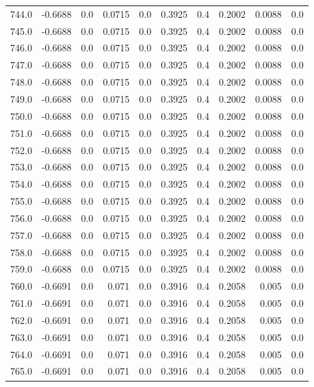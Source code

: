 \begin{longtable}{lrrrrrrrrr}
744.0 & -0.6688 & 0.0 & 0.0715 & 0.0 & 0.3925 & 0.4 & 0.2002 & 0.0088 & 0.0 \\
745.0 & -0.6688 & 0.0 & 0.0715 & 0.0 & 0.3925 & 0.4 & 0.2002 & 0.0088 & 0.0 \\
746.0 & -0.6688 & 0.0 & 0.0715 & 0.0 & 0.3925 & 0.4 & 0.2002 & 0.0088 & 0.0 \\
747.0 & -0.6688 & 0.0 & 0.0715 & 0.0 & 0.3925 & 0.4 & 0.2002 & 0.0088 & 0.0 \\
748.0 & -0.6688 & 0.0 & 0.0715 & 0.0 & 0.3925 & 0.4 & 0.2002 & 0.0088 & 0.0 \\
749.0 & -0.6688 & 0.0 & 0.0715 & 0.0 & 0.3925 & 0.4 & 0.2002 & 0.0088 & 0.0 \\
750.0 & -0.6688 & 0.0 & 0.0715 & 0.0 & 0.3925 & 0.4 & 0.2002 & 0.0088 & 0.0 \\
751.0 & -0.6688 & 0.0 & 0.0715 & 0.0 & 0.3925 & 0.4 & 0.2002 & 0.0088 & 0.0 \\
752.0 & -0.6688 & 0.0 & 0.0715 & 0.0 & 0.3925 & 0.4 & 0.2002 & 0.0088 & 0.0 \\
753.0 & -0.6688 & 0.0 & 0.0715 & 0.0 & 0.3925 & 0.4 & 0.2002 & 0.0088 & 0.0 \\
754.0 & -0.6688 & 0.0 & 0.0715 & 0.0 & 0.3925 & 0.4 & 0.2002 & 0.0088 & 0.0 \\
755.0 & -0.6688 & 0.0 & 0.0715 & 0.0 & 0.3925 & 0.4 & 0.2002 & 0.0088 & 0.0 \\
756.0 & -0.6688 & 0.0 & 0.0715 & 0.0 & 0.3925 & 0.4 & 0.2002 & 0.0088 & 0.0 \\
757.0 & -0.6688 & 0.0 & 0.0715 & 0.0 & 0.3925 & 0.4 & 0.2002 & 0.0088 & 0.0 \\
758.0 & -0.6688 & 0.0 & 0.0715 & 0.0 & 0.3925 & 0.4 & 0.2002 & 0.0088 & 0.0 \\
759.0 & -0.6688 & 0.0 & 0.0715 & 0.0 & 0.3925 & 0.4 & 0.2002 & 0.0088 & 0.0 \\
760.0 & -0.6691 & 0.0 & 0.071 & 0.0 & 0.3916 & 0.4 & 0.2058 & 0.005 & 0.0 \\
761.0 & -0.6691 & 0.0 & 0.071 & 0.0 & 0.3916 & 0.4 & 0.2058 & 0.005 & 0.0 \\
762.0 & -0.6691 & 0.0 & 0.071 & 0.0 & 0.3916 & 0.4 & 0.2058 & 0.005 & 0.0 \\
763.0 & -0.6691 & 0.0 & 0.071 & 0.0 & 0.3916 & 0.4 & 0.2058 & 0.005 & 0.0 \\
764.0 & -0.6691 & 0.0 & 0.071 & 0.0 & 0.3916 & 0.4 & 0.2058 & 0.005 & 0.0 \\
765.0 & -0.6691 & 0.0 & 0.071 & 0.0 & 0.3916 & 0.4 & 0.2058 & 0.005 & 0.0 \\

\end{longtable}
